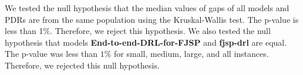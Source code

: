 We tested the null hypothesis that the median values of gaps of all models and PDRs are from the same population using the Kruskal-Wallis test. The p-value is less than 1$\%$. Therefore, we reject this hypothesis. We also tested the null hypothesis that models \textbf{End-to-end-DRL-for-FJSP} and \textbf{fjsp-drl} are equal. The p-value was less than $1\%$ for small, medium, large, and all instances. Therefore, we rejected this null hypothesis.



